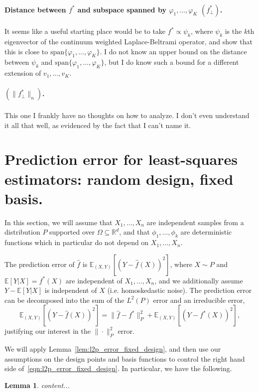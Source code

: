 \documentclass{article}
\newcommand{\Reals}{\mathbb{R}}
\newcommand{\1}{\mathbf{1}}
\newcommand{\Rd}{\Reals^d}
\newcommand{\wh}[1]{\widehat{#1}}
\newtheorem{lemma}{Lemma}
\theoremstyle{definition}
\theoremstyle{remark}
\begin{document}
\paragraph{Distance between $f^{\ast}$ and subspace spanned by $\varphi_1,\ldots,\varphi_K$ $(f_{\perp}^{\ast})$.}

It seems like a useful starting place would be to take $f^{\ast} \propto \psi_k$, where $\psi_k$ is the $k$th eigenvector of the continuum weighted Laplace-Beltrami operator, and show that this is close to $\mathrm{span}\{\varphi_1,\ldots,\varphi_K\}$. I do not know an upper bound on the distance between $\psi_k$ and $\mathrm{span}\{\varphi_1,\ldots,\varphi_K\}$, but I do know such a bound for a different extension of $v_1,\ldots,v_K$. 

\paragraph{$(\|f_{\perp}^{\ast}\|_n)$.}

This one I frankly have no thoughts on how to analyze. I don't even understand it all that well, as evidenced by the fact that I can't name it.


\clearpage

\section{Prediction error for least-squares estimators: random design, fixed basis.}
In this section, we will assume that $X_1,\ldots,X_n$ are independent samples from a distribution $P$ supported over $\Omega \subseteq \Rd$, and that $\phi_1,\ldots,\phi_k$ are deterministic functions which in particular do not depend on $X_1,\ldots,X_n$.

The prediction error of $\wh{f}$ is $\mathbb{E}_{(X,Y)}[(Y - \wh{f}(X))^2]$, where $X \sim P$ and $\mathbb{E}[Y|X] = f^{\ast}(X)$ are independent of $X_1,\ldots,X_n$, and we additionally assume $Y - \mathbb{E}[Y|X]$ is independent of $X$ (i.e. homoskedastic noise). The prediction error can be decomposed into the sum of the $L^2(P)$ error and an irreducible error,
\begin{equation}
\mathbb{E}_{(X,Y)}[(Y - \wh{f}(X))^2] = \|\wh{f} - f^{\ast}\|_P^2 + \mathbb{E}_{(X,Y)}[(Y - f^{\ast}(X))^2],
\end{equation}
justifying our interest in the $\|\cdot\|_P^2$ error.

We will apply Lemma~\ref{lem:l2p_error_fixed_design}, and then use our assumptions on the design points and basis functions to control the right hand side of~\eqref{eqn:l2p_error_fixed_design}. In particular, we have the following. 
\begin{lemma}
	content...
\end{lemma}
\end{document}
